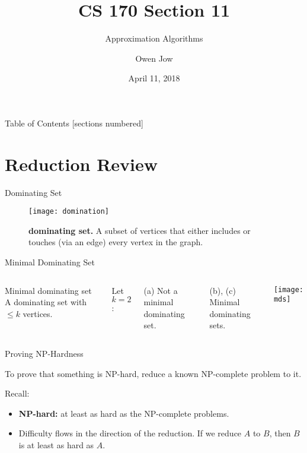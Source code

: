 \documentclass[10pt]{beamer}
\title{CS 170 Section 11}
\subtitle{Approximation Algorithms}
\date{April 11, 2018}
\author{Owen Jow}
\institute{University of California, Berkeley}
\begin{document}
\maketitle

\begin{frame}{Table of Contents}
  [sections numbered]
  \tableofcontents[hideallsubsections]
\end{frame}

\section{Reduction Review}

\begin{frame}[fragile]{Dominating Set}

\begin{figure}
  \texttt{[image: domination]}
  \caption{\textbf{dominating set.} A subset of vertices that either includes or touches (via an edge) every vertex in the graph.}
\end{figure}

\end{frame}

\begin{frame}[fragile]{Minimal Dominating Set}

\begin{columns}[T, onlytextwidth]
  \begin{block}{Minimal dominating set}
    A dominating set with $\leq k$ vertices.
  \end{block}

  Let $k = 2$:

  \begin{alertblock}{(a)}
    Not a minimal dominating set.
  \end{alertblock}

  \begin{exampleblock}{(b), (c)}
    Minimal dominating sets.
  \end{exampleblock}

  \texttt{[image: mds]}
\end{columns}

\end{frame}

\begin{frame}[fragile]{Proving NP-Hardness}

To prove that something is NP-hard, reduce a known NP-complete problem to it.

Recall:
\begin{itemize}
\item \textbf{NP-hard:} at least as hard as the NP-complete problems.
\item Difficulty flows in the direction of the reduction. If we reduce $A$ to $B$, then $B$ is at least as hard as $A$.
\end{itemize}

\end{frame}
\end{document}
